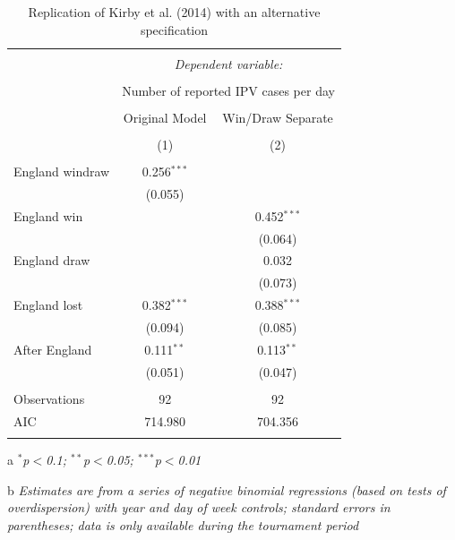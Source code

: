 \documentclass[12pt, letterpaper]{article}
\begin{document}
\begin{table}
\centering
 \caption{Replication of Kirby et al. (2014) with an alternative specification}
   \label{kirbyrep1}
 \begin{threeparttable}
\begin{tabular}{@{\extracolsep{5pt}}lcc} 
\\[-1.8ex]\hline 
\hline \\[-1.8ex] 
 & \multicolumn{2}{c}{\textit{Dependent variable:}} \\ 
\cline{2-3} 
\\[-1.8ex] & \multicolumn{2}{c}{Number of reported IPV cases per day} \\ 
\\ 
 & Original Model & Win/Draw Separate \\ 
\\[-1.8ex] & (1) & (2)\\ 
\hline \\[-1.8ex] 
 England windraw & 0.256$^{***}$ &  \\ 
  & (0.055) &  \\ 
  England win &  & 0.452$^{***}$ \\ 
  &  & (0.064) \\ 
  England draw &  & 0.032 \\ 
  &  & (0.073) \\ 
  England lost & 0.382$^{***}$ & 0.388$^{***}$ \\ 
  & (0.094) & (0.085) \\ 
  After England & 0.111$^{**}$ & 0.113$^{**}$ \\ 
  & (0.051) & (0.047) \\ 
 \hline \\[-1.8ex] 
Observations & 92 & 92 \\ 
AIC & 714.980 & 704.356 \\ 
\hline \\[-1.8ex] 
\end{tabular} 
\begin{tablenotes}
      \item[a] \textit{$^{*}$p$<$0.1; $^{**}$p$<$0.05; $^{***}$p$<$0.01}
      \item[b] \textit{Estimates are from a series of negative binomial regressions (based on tests of overdispersion) with year and day of week controls; standard errors in parentheses; data is only available during the tournament period}
    \end{tablenotes}
\end{threeparttable} 
\end{table}
\end{document}
